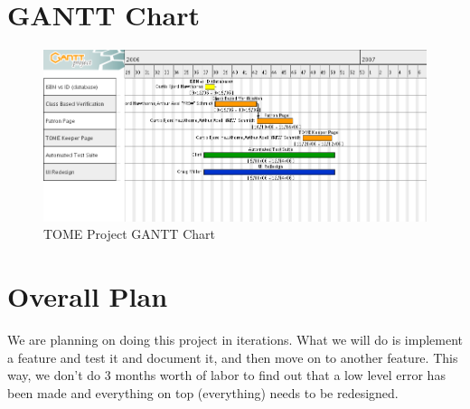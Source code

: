 \documentclass[12pt,titlepage]{article}
\begin{document}
\section{GANTT Chart}
\begin{figure}[h]
	\includegraphics[width=\textwidth]{GanttChart}
	\caption{TOME Project GANTT Chart}
\end{figure}
\section{Overall Plan}
We are planning on doing this project in iterations.  What we will do is implement a feature and test it and document it, and then move on to another feature.  This way, we don't do 3 months worth of labor to find out that a low level error has been made and everything on top (everything) needs to be redesigned.
\end{document}
